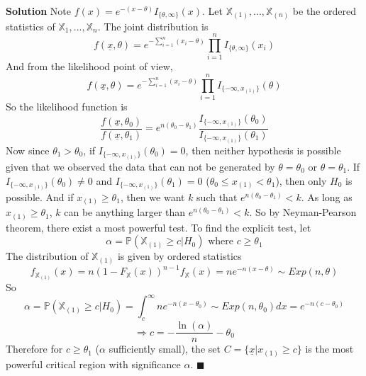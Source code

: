 \textbf{Solution} Note $f(x) = e^{-(x-\theta)} I_{\{\theta, \infty\}}(x)$. Let $\mathbb{X}_{(1)}, ..., \mathbb{X}_{(n)}$ be the ordered statistics of $\mathbb{X}_1, ..., \mathbb{X}_n$. The joint distribution is
$$f(\underline{x}, \theta) = e^{-\sum_{i=1}^n (x_i - \theta)} \prod_{i=1}^n I_{\{\theta, \infty\}}(x_i)$$
And from the likelihood point of view,
$$f(\underline{x}, \theta) = e^{-\sum_{i=1}^n (x_i - \theta)} \prod_{i=1}^n I_{\{-\infty, x_{(1)}\}}(\theta)$$
So the likelihood function is
$$\frac{f(\underline{x}, \theta_0)}{f(\underline{x}, \theta_1)} = e^{n(\theta_0 - \theta_1)} \frac{I_{\{-\infty, x_{(1)}\}}(\theta_0)}{I_{\{-\infty, x_{(1)}\}}(\theta_1)}$$
Now since $\theta_1 > \theta_0$, if $I_{\{-\infty, x_{(1)}\}}(\theta_0) = 0$, then neither hypothesis is possible given that we observed the data that can not be generated by $\theta = \theta_0$ or $\theta = \theta_1$. If $I_{\{-\infty, x_{(1)}\}}(\theta_0) \neq 0$ and $I_{\{-\infty, x_{(1)}\}}(\theta_1) = 0$ ($\theta_0 \leq x_{(1)} < \theta_1$), then only $H_0$ is possible. And if $x_{(1)} \geq \theta_1$, then we want $k$ such that $e^{n(\theta_0 - \theta_1)} < k$. As long as $x_{(1)} \geq \theta_1$, $k$ can be anything larger than $e^{n(\theta_0 - \theta_1)} < k$. So by Neyman-Pearson theorem, there exist a most powerful test. To find the explicit test, let
$$\alpha = \mathbb{P}(\mathbb{X}_{(1)} \geq c | H_0) \text{ where } c \geq \theta_1$$
The distribution of $\mathbb{X}_{(1)}$ is given by ordered statistics
$$f_{\mathbb{X}_{(1)}}(x) = n (1-F_{\mathbb{X}}(x))^{n-1} f_{\mathbb{X}}(x) = n e^{-n (x-\theta)} \sim Exp(n, \theta) $$
So
$$\alpha = \mathbb{P}(\mathbb{X}_{(1)} \geq c | H_0) = \int_c^\infty  n e^{-n (x-\theta_0)} \sim Exp(n, \theta_0) dx = e^{-n(c-\theta_0)}$$
$$\Rightarrow c = -\frac{\ln(\alpha)}{n} - \theta_0$$
Therefore for $c \geq \theta_1$ ($\alpha$ sufficiently small), the set $C = \{\underline{x} | x_{(1)} \geq c\}$ is the most powerful critical region with significance $\alpha$. $\blacksquare$